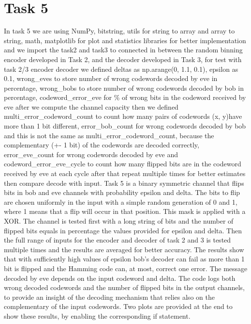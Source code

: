 \documentclass{report}
\begin{document}
\section*{Task 5}
In task 5 we are using NumPy, bitstring, utils for string to array and array to string, math, matplotlib for plot and statistics libraries for better implementation and we import the task2 and task3 to connected in between the random binning encoder developed in Task 2, and the decoder
developed in Task 3, for test with task 2/3 encoder decoder we defined deltas as np.arange(0, 1.1, 0.1), epsilon  as 0.1, wrong\_eves to store number of wrong codewords decoded by eve in percentage, wrong\_bobs to store number of wrong codewords decoded by bob in percentage, codeword\_error\_eve for \% of wrong bits in the codeword received by eve after we compute the channel capacity then we defined     multi\_error\_codeword\_count to count how many pairs of codewords (x, y)have more than 1 bit different, error\_bob\_count for wrong codewords decoded by bob and this is not the same as multi\_error\_codeword\_count, because the complementary (+- 1 bit) of the codewords are decoded correctly, error\_eve\_count for wrong codewords decoded by eve and codeword\_error\_eve\_cycle to count how many flipped bits are in the codeword received by eve at each cycle after that repeat multiple times for better estimates then compare decode with input.\hfill \break \linebreak
Task 5 is a binary symmetric channel that flips bits in bob and eve channels with probability epsilon and delta. The bits to flip are chosen uniformly in the input with a simple random generation of 0 and 1, where 1 means that a flip will occur in that position. This mask is applied with a XOR.
The channel is tested first with a long string of bits and the number of flipped bits equals in percentage the values provided for epsilon and delta.
Then the full range of inputs for the encoder and decoder of task 2 and 3 is tested multiple times and the results are averaged for better accuracy.
The results show that with sufficiently high values of epsilon bob's decoder can fail as more than 1 bit is flipped and the Hamming code can, at most, correct one error. The message decoded by eve depends on the input codeword and delta.
The code logs both wrong decoded codewords and the number of flipped bits in the output channels, to provide an insight of the decoding mechanism that relies also on the complementary of the input codewords.
Two plots are provided at the end to show these results, by enabling the corresponding if statement. \hfill \break \linebreak
\end{document}
